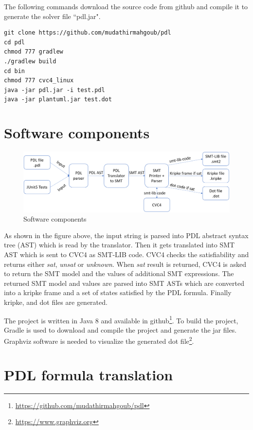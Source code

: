 \documentclass[12pt,a4paper]{article}
\begin{document}
The following commands download the source code from github and compile it to generate the solver file ``pdl.jar". 

\begin{verbatim}
git clone https://github.com/mudathirmahgoub/pdl
cd pdl
chmod 777 gradlew
./gradlew build
cd bin
chmod 777 cvc4_linux
java -jar pdl.jar -i test.pdl 
java -jar plantuml.jar test.dot
\end{verbatim}



\section{Software components}
\begin{figure}[H]
\center
\includegraphics[scale=0.35]{solver.png}
\caption{Software components}
\end{figure}

As shown in the figure above, the input string is parsed into PDL abstract syntax tree (AST) which is read by the translator. Then it gets translated into SMT AST which is sent to CVC4 as SMT-LIB code. CVC4 checks the satisfiability and returns either \textit{sat}, \textit{unsat} or \textit{unknown}. When \textit{sat} result is returned, CVC4 is asked to return the SMT model and the values of additional SMT expressions. The returned SMT model and values are parsed into SMT ASTs which are converted into a kripke frame and a set of states satisfied by the PDL formula. Finally kripke, and dot files are generated. 

The project is written in Java 8 and available in github\footnote{\url{https://github.com/mudathirmahgoub/pdl}}. To build the project, Gradle is used to download and compile the project and generate the jar files. Graphviz software is needed to visualize the generated dot file\footnote{\url{https://www.graphviz.org}}. 

\section{PDL formula translation}
\end{document}
